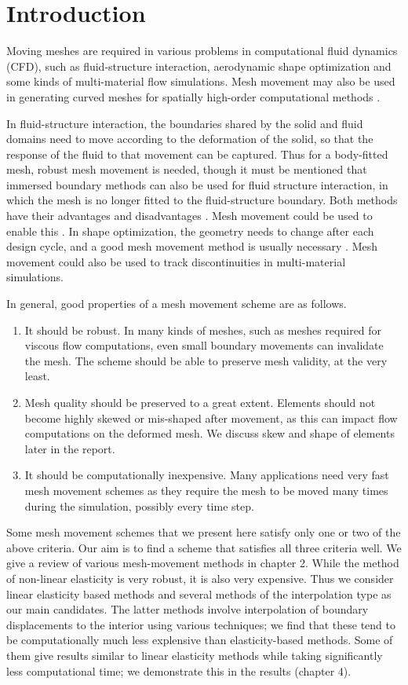 \chapter{Introduction}

Moving meshes are required in various problems in computational fluid dynamics (CFD), such as fluid-structure interaction, aerodynamic shape optimization \cite{appl:opt, appl:mavriplis} and some kinds of multi-material flow simulations. Mesh movement may also be used in generating curved meshes for spatially high-order computational methods \cite{curve:persson}. 

In fluid-structure interaction, the boundaries shared by the solid and fluid domains need to move according to the deformation of the solid, so that the response of the fluid to that movement can be captured. Thus for a body-fitted mesh, robust mesh movement is needed, though it must be mentioned that immersed boundary methods can also be used for fluid structure interaction, in which the mesh is no longer fitted to the fluid-structure boundary. Both methods have their advantages and disadvantages \cite{appl:fsireview}. Mesh movement could be used to enable this \cite{mm:fsielast}. In shape optimization, the geometry needs to change after each design cycle, and a good mesh movement method is usually necessary \cite{appl:opt}. Mesh movement could also be used to track discontinuities in multi-material simulations.

In general, good properties of a mesh movement scheme are as follows.
\begin{enumerate}
\item It should be robust. In many kinds of meshes, such as meshes required for viscous flow computations, even small boundary movements can invalidate the mesh. The scheme should be able to preserve mesh validity, at the very least.
\item Mesh quality should be preserved to a great extent. Elements should not become highly skewed or mis-shaped after movement, as this can impact flow computations on the deformed mesh. We discuss skew and shape of elements later in the report.
\item It should be computationally inexpensive. Many applications need very fast mesh movement schemes as they require the mesh to be moved many times during the simulation, possibly every time step.
\end{enumerate}
Some mesh movement schemes that we present here satisfy only one or two of the above criteria. Our aim is to find a scheme that satisfies all three criteria well. We give a review of various mesh-movement methods in chapter 2. While the method of non-linear elasticity \cite{curve:persson} is very robust, it is also very expensive. Thus we consider linear elasticity based methods and several methods of the interpolation type as our main candidates. The latter methods involve interpolation of boundary displacements to the interior using various techniques; we find that these tend to be computationally much less explensive than elasticity-based methods. Some of them give results similar to linear elasticity methods while taking significantly less computational time; we demonstrate this in the results (chapter 4).

